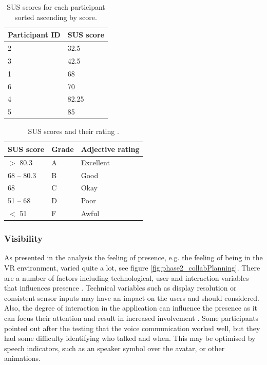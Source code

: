 \begin{table}[H]
\centering
\begin{tabular}{l|l}
{ \textbf{Participant ID}} & { \textbf{SUS score}} \\ \hline
2   & 32.5                                     \\ 
3   & 42.5                                    \\ 
1   & 68                                   \\ 
6   & 70                                     \\ 
4   & 82.25                                    \\ 
5   & 85                                     \\ 
\end{tabular}
\caption{SUS scores for each participant sorted ascending by score.}
\label{table:SUSscores}
\end{table}


\begin{table}[H]
\centering
\begin{tabular}{l|l|l}
{ \textbf{SUS score}} & { \textbf{Grade}} & { \textbf{Adjective rating}} \\ \hline
$>$ 80.3   & A &  Excellent                                 \\ 
68 – 80.3   & B & Good                                  \\ 
68   & C   &   Okay                              \\ 
51 – 68   & D   &  Poor                               \\ 
$<$ 51  & F      &     Awful                         \\ 
\end{tabular}
\caption{SUS scores and their rating \cite{SusMeasuringInterpret}.}
\label{table:SUSinterpret}
\end{table}



\subsubsection{Visibility}
\label{section:phase2visibility}
As presented in the analysis the feeling of presence, e.g. the feeling of being in the VR environment, varied quite a lot, see figure \ref{fig:phase2_collabPlanning}. There are a number of factors including technological, user and interaction variables that influences presence \cite{oh2018systematic} \cite{presenceInVirtualReality:}. Technical variables such as display resolution or consistent sensor inputs may have an impact on the users and should considered. Also, the degree of interaction in the application can influence the presence as it can focus their attention and result in increased involvement \cite{presenceInVirtualReality:}. 
Some participants pointed out after the testing that the voice communication worked well, but they had some difficulty identifying who talked and when. This may be optimised by speech indicators, such as an speaker symbol over the avatar, or other animations.     

